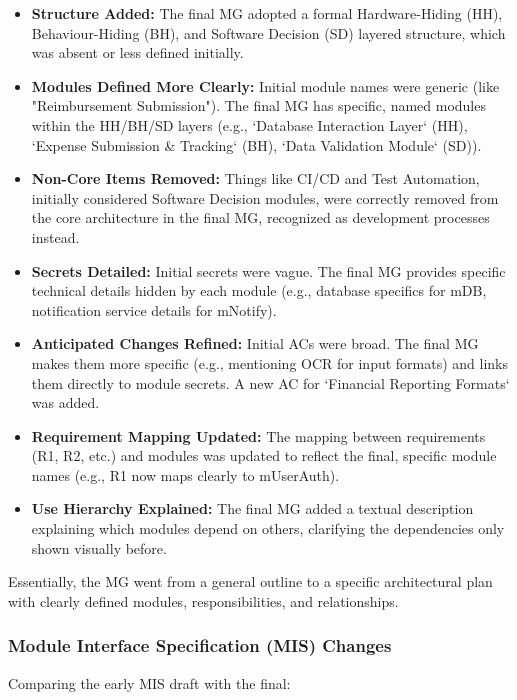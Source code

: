 \documentclass{article}
\begin{document}
\begin{itemize}
    \item \textbf{Structure Added:} The final MG adopted a formal Hardware-Hiding (HH), Behaviour-Hiding (BH), and Software Decision (SD) layered structure, which was absent or less defined initially.
    \item \textbf{Modules Defined More Clearly:} Initial module names were generic (like "Reimbursement Submission"). The final MG has specific, named modules within the HH/BH/SD layers (e.g., `Database Interaction Layer` (HH), `Expense Submission \& Tracking` (BH), `Data Validation Module` (SD)).
    \item \textbf{Non-Core Items Removed:} Things like CI/CD and Test Automation, initially considered Software Decision modules, were correctly removed from the core architecture in the final MG, recognized as development processes instead.
    \item \textbf{Secrets Detailed:} Initial secrets were vague. The final MG provides specific technical details hidden by each module (e.g., database specifics for {mDB}, notification service details for {mNotify}).
    \item \textbf{Anticipated Changes Refined:} Initial ACs were broad. The final MG makes them more specific (e.g., mentioning OCR for input formats) and links them directly to module secrets. A new AC for `Financial Reporting Formats` was added.
    \item \textbf{Requirement Mapping Updated:} The mapping between requirements (R1, R2, etc.) and modules was updated to reflect the final, specific module names (e.g., R1 now maps clearly to {mUserAuth}).
    \item \textbf{Use Hierarchy Explained:} The final MG added a textual description explaining which modules depend on others, clarifying the dependencies only shown visually before.
\end{itemize}
Essentially, the MG went from a general outline to a specific architectural plan with clearly defined modules, responsibilities, and relationships.

\subsubsection{Module Interface Specification (MIS) Changes}

Comparing the early MIS draft with the final:
\end{document}
